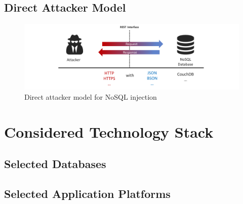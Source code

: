 
\subsection{Direct Attacker Model}

\begin{figure}[h]
\centering
  \includegraphics[width=1\linewidth]{Images/attacker_model_direct}
  \caption{Direct attacker model for NoSQL injection}
  \label{fig:extendedAttackerModel}
\end{figure}



\section{Considered Technology Stack}
\subsection{Selected Databases}
\subsection{Selected Application Platforms}